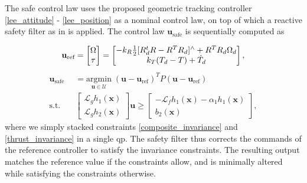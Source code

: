 The safe control law uses the proposed geometric tracking controller \eqref{lee_attitude} - \eqref{lee_position} as a nominal control law, on top of which a reactive safety filter as in \cite{backstepping_CBF} is applied. The control law $\mathbf{u}_\text{safe}$ is sequentially computed as 

\small
\begin{equation}\label{ref_controller}
\mathbf{u}_\text{ref} = 
\begin{bmatrix}
    \Omega \\ 
    \tau
\end{bmatrix}
= 
\begin{bmatrix}
    -k_R \frac{1}{2}[R_d^tR - R^T R_d]\textsuperscript{$\wedge$} + R^T R_d \Omega_{d} \\ 
    k_T (T_d - T) + \dot{T}_d
\end{bmatrix},
\end{equation}
\vspace{-2ex}
\begin{subequations}\label{OCP}
    \begin{align}
    \mathbf{u}_\text{safe} &= \underset{\mathbf{u} \in \mathcal{U}}{\text{argmin}} \; (\mathbf{u} - \mathbf{u}_\text{ref})^T P (\mathbf{u} - \mathbf{u}_\text{ref}) \\
    \text{s.t.} \quad 
    &\begin{bmatrix} \label{stacked_constraints}
        \mathcal{L}_g h_1(\mathbf{x}) \\
        \mathcal{L}_g h_2(\mathbf{x})
    \end{bmatrix}
    \mathbf{u} \geq 
    \begin{bmatrix}
        -\mathcal{L}_f h_1(\mathbf{x}) -\alpha_1 h_1(\mathbf{x})\\
        b_2(\mathbf{x})
    \end{bmatrix},
    \end{align}
\end{subequations}
\normalsize
where we simply stacked constraints \eqref{composite_invariance} and \eqref{thrust_invariance} in a single \ac{qp}. The safety filter thus corrects the commands of the reference controller to satisfy the invariance constraints. The resulting output matches the reference value if the constraints allow, and is minimally altered while satisfying the constraints otherwise.


